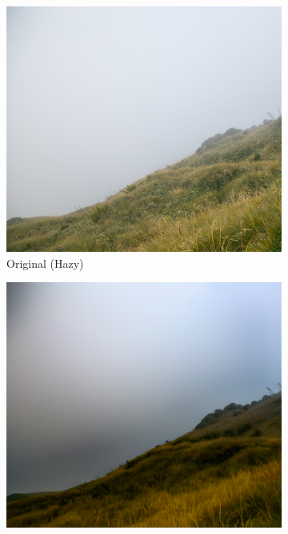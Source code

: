\documentclass{article}
\begin{document}
\begin{figure}[t]
\centering
\begin{subfigure}[b]{0.32\textwidth}
    \centering
    \includegraphics[width=\textwidth]{examples_original/1.png}
    \caption{Original (Hazy)}
\end{subfigure}
\hfill
\begin{subfigure}[b]{0.32\textwidth}
    \centering
    \includegraphics[width=\textwidth]{examples_baseline/1.png}

\end{subfigure}
\end{figure}
\end{document}
